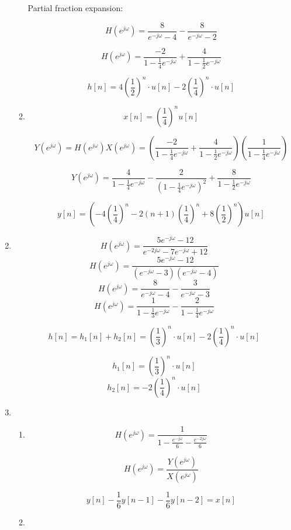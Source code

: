 \documentclass[10pt,a4paper, margin=1in]{article}
\begin{document}
\begin{enumerate}
\begin{enumerate}
    Partial fraction expansion:
    
    \[H(e^{j\omega}) = \frac{8}{e^{-j\omega} - 4} - \frac{8}{e^{-j\omega} - 2}\]
    
    \[H(e^{j\omega}) = \frac{-2}{1 - \frac{1}{4} e^{-j\omega}} + \frac{4}{1 - \frac{1}{2}e^{-j\omega}}\]
    
    \[h[n] = 4(\frac{1}{2})^n \cdot u[n] -2(\frac{1}{4})^n \cdot u[n]\]
    
    \item %
    
    \[ x[n] = (\frac{1}{4})^n u[n]\]
    
    \[ Y(e^{j\omega}) = H(e^{j\omega})X(e^{j\omega}) = (\frac{-2}{1 - \frac{1}{4} e^{-j\omega}} + \frac{4}{1 - \frac{1}{2}e^{-j\omega}}) (\frac{1}{1-\frac{1}{4}e^{-j\omega}})\]
    
    
    \[ Y(e^{j\omega}) = \frac{4}{1-\frac{1}{4}e^{-j\omega}} -  \frac{2}{(1-\frac{1}{4}e^{-j\omega})^2}+ \frac{8}{1-\frac{1}{2}e^{-j\omega}}\]
    
    \[y[n] = (-4(\frac{1}{4})^n- 2(n+1)(\frac{1}{4})^n + 8 (\frac{1}{2})^n) u[n] \]
    
    \end{enumerate}

\item %
    \[H(e^{j\omega}) = \frac{5e^{-j\omega} - 12}{e^{-2j\omega} - 7 e^{-j\omega} + 12}\]
    \[H(e^{j\omega}) = \frac{5e^{-j\omega} - 12}{(e^{-j\omega} - 3)(e^{-j\omega} - 4)}\]
    \[H(e^{j\omega}) = \frac{8}{e^{-j\omega} - 4} - \frac{3}{e^{-j\omega} - 3}\]
    \[H(e^{j\omega}) = \frac{1}{1 - \frac{1}{3} e^{-j\omega}} - \frac{2}{1 - \frac{1}{4} e^{-j\omega}}\]
    
    \[ h[n] = h_1[n] + h_2[n] = (\frac{1}{3})^n \cdot u[n] - 2 (\frac{1}{4})^n \cdot u[n] \]
    
    \[ h_1[n] = (\frac{1}{3})^n \cdot u[n] \]
    \[ h_2[n] = -2 (\frac{1}{4})^n \cdot u[n] \]
    

\item %
    \begin{enumerate}
    \item %
    \[H(e^{j\omega}) = \frac{1}{1-\frac{e^{-j\omega}}{6} - \frac{e^{-2j\omega}}{6} } \]
    
    \[ H(e^{j\omega}) = \frac{Y(e^{j\omega})}{X(e^{j\omega})}\]
    
    \[ y[n] - \frac{1}{6}y[n-1] - \frac{1}{6}y[n-2] = x[n]\]
    \item %
    

\end{enumerate}
\end{enumerate}
\end{document}
